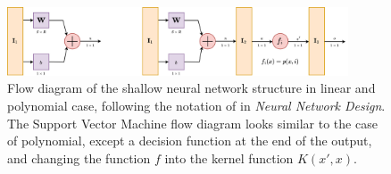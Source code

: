 \documentclass[10pt]{article} %
\begin{document}
\begin{figure}[htb]
    \centering
    \includegraphics[width=0.9\textwidth]{structure_network_1.png}
    \caption{Flow diagram of the shallow neural network structure in linear and polynomial case, following the notation of \cite{10.5555/2721661} in \textit{Neural Network Design}. The Support Vector Machine flow diagram looks similar to the case of polynomial, except a decision function at the end of the output, and changing the function $f$ into the kernel function $K(x',x)$.}
\end{figure}
\end{document}

